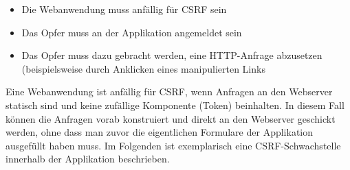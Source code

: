 \begin{itemize}
      \item Die Webanwendung muss anfällig für CSRF sein
	  \item Das Opfer muss an der Applikation angemeldet sein
	  \item Das Opfer muss dazu gebracht werden, eine HTTP-Anfrage abzusetzen (beispielsweise durch Anklicken eines manipulierten Links
\end{itemize}

Eine Webanwendung ist  anfällig für CSRF, wenn Anfragen an den Webserver statisch sind und keine zufällige Komponente (Token) beinhalten. In diesem Fall können die Anfragen vorab konstruiert und direkt an den Webserver geschickt werden, ohne dass man zuvor die eigentlichen Formulare der Applikation ausgefüllt haben muss.
Im Folgenden ist exemplarisch eine CSRF-Schwachstelle innerhalb der Applikation beschrieben.

